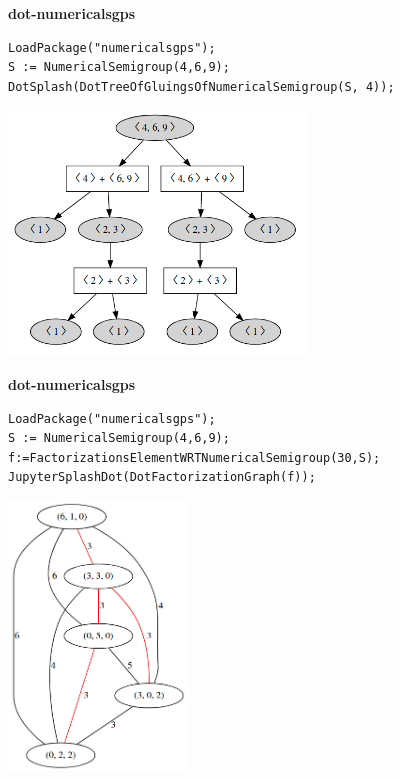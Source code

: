 \documentclass[10pt,compress]{beamer}
\begin{document}
\begin{frame}[fragile]
  \begin{center}
  {\color{ChetwodeBlue}\Large\textbf{dot-numericalsgps}}    
  \end{center}
\begin{verbatim}
LoadPackage("numericalsgps");
S := NumericalSemigroup(4,6,9);
DotSplash(DotTreeOfGluingsOfNumericalSemigroup(S, 4));
\end{verbatim}

\begin{center}
\includegraphics[width=0.6\textwidth]{./images/tree-gluings.png}  
\end{center}
\end{frame}

\begin{frame}[fragile]
  \begin{center}
  {\color{ChetwodeBlue}\Large\textbf{dot-numericalsgps}}    
  \end{center}
\begin{verbatim}
LoadPackage("numericalsgps");
S := NumericalSemigroup(4,6,9);
f:=FactorizationsElementWRTNumericalSemigroup(30,S);
JupyterSplashDot(DotFactorizationGraph(f));
\end{verbatim}

\begin{center}
\includegraphics[width=0.36\textwidth]{./images/factorizations.png}  
\end{center}
\end{frame}
\end{document}
